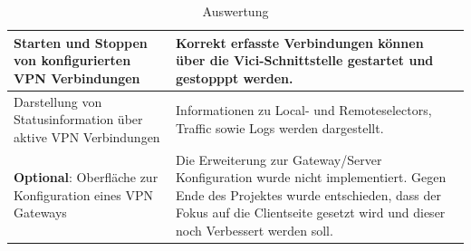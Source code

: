 \begin{table}[H]
\begin{tabular}{|p{}|p{}|}
    Starten und Stoppen von konfigurierten VPN Verbindungen & Korrekt erfasste Verbindungen können über die Vici-Schnittstelle gestartet und gestopppt werden. \\ \hline
    Darstellung von Statusinformation über aktive VPN Verbindungen & Informationen zu Local- und Remoteselectors, Traffic sowie Logs werden dargestellt. \\ \hline
    \textbf{Optional}: Oberfläche zur Konfiguration eines VPN Gateways & Die Erweiterung zur Gateway/Server Konfiguration wurde nicht implementiert. Gegen Ende des Projektes wurde entschieden, dass der Fokus auf die Clientseite gesetzt wird und dieser noch Verbessert werden soll.   \\ \hline 
    \end{tabular}
    \caption[Auswertung]{Auswertung}
\end{table}
\medskip \medskip